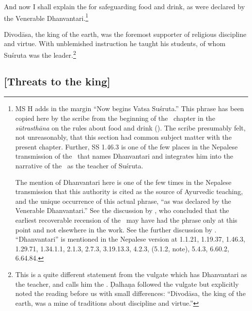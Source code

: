 \begin{translation}
 \item[1--2]  
 
 And now I shall explain the  for
safeguarding food and drink, as were declared by the Venerable
Dhanvantari.\footnote{MS H adds in the margin  “Now begins Vatsa Suśruta.”  This phrase has been copied
    here by the scribe from the beginning of the \SS\ chapter in the
    \emph{sūtrasthāna} on the rules about food and drink
    ().  The scribe presumably felt, not unreasonably,
    that this section had common subject matter with the present
    chapter.  Further, SS 1.46.3 is one of the few places in the
    Nepalese transmission of the \SS\ that names Dhanvantari and
    integrates him into the narrative of the \SS\ as the teacher of
    Suśruta. %
  
The mention of Dhanvantari here is one of the few times in the Nepalese
transmission that this authority is cited as the source of Ayurvedic
teaching, and the unique occurrence of this actual phrase, “as was
declared by the Venerable Dhanvantari.” See the discussion by
\citet[28--32]{kleb-2021b}, who concluded that the earliest
recoverable recension of the \SS\ may have had the phrase only at this
point and not elsewhere in the work. See the further discussion by
\citet{birc-2021}.  “Dhanvantari” is mentioned in the Nepalese version at 
1.1.21, 1.19.37, 1.46.3, 1.29.71, 1.34.1.1, 2.1.3, 2.7.3, 3.19.13.3, 4.2.3, (5.1.2, 
note), 5.4.3, 6.60.2, 6.64.84.%
}
 
 \item[3] 

 Divodāsa, the king of the earth, was the foremost supporter of religious
discipline and virtue. With unblemished instruction he taught his students, of
whom Suśruta was the leader.\footnote{This is a quite different statement from
the vulgate which has Dhanvantari as the teacher, and calls him the
 \citep[559]{vulgate}.  Ḍalhaṇa followed the vulgate
but explicitly noted the reading before us with small differences:  “Divodāsa, the king of the earth, was a mine of
traditions about discipline and virtue.”}

\subsection{[Threats to the king]}


\end{translation}
